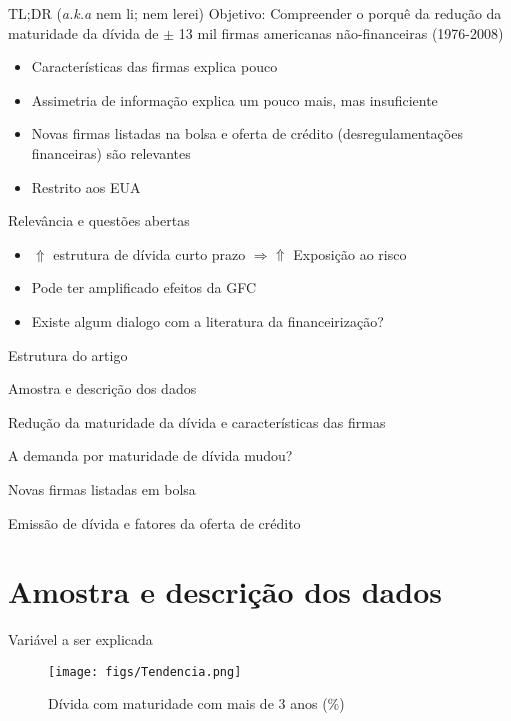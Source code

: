 \documentclass[presentation]{beamer}
\begin{document}
\begin{frame}[label={sec:org0e95a44}]{TL;DR (\emph{a.k.a} nem li; nem lerei)}
\alert{Objetivo:} Compreender o porquê da redução da maturidade da dívida de \(\pm\) 13 mil firmas americanas não-financeiras (1976-2008)
\begin{itemize}
\item Características das firmas explica pouco
\item Assimetria de informação explica um pouco mais, mas insuficiente
\item Novas firmas listadas na bolsa e oferta de crédito (desregulamentações financeiras) são relevantes
\item Restrito aos EUA
\end{itemize}


\begin{block}{Relevância e questões abertas}
\begin{itemize}
\item \(\Uparrow\) estrutura de dívida  curto prazo \(\Rightarrow \Uparrow\) Exposição ao risco
\item Pode ter amplificado efeitos da GFC
\item Existe algum dialogo com a literatura da financeirização?
\end{itemize}
\end{block}
\end{frame}


\begin{frame}[label={sec:org8de9697}]{Estrutura do artigo}
\begin{block}{Amostra e descrição dos dados}
\end{block}
\begin{block}{Redução da maturidade da dívida e características das firmas}
\end{block}
\begin{block}{A demanda por maturidade de dívida mudou?}
\end{block}
\begin{block}{Novas firmas listadas em bolsa}
\end{block}
\begin{block}{Emissão de dívida e fatores da oferta de crédito}
\end{block}
\end{frame}
\section{Amostra e descrição dos dados}
\label{sec:org9a5a1dd}
\begin{frame}[label={sec:org6b69b21}]{Variável a ser explicada}
\begin{figure}[htbp]
\caption{Dívida com maturidade com mais de 3 anos (\%)}
\centerline{\texttt{[image: figs/Tendencia.png]}}
\end{figure}
\end{frame}
\end{document}
